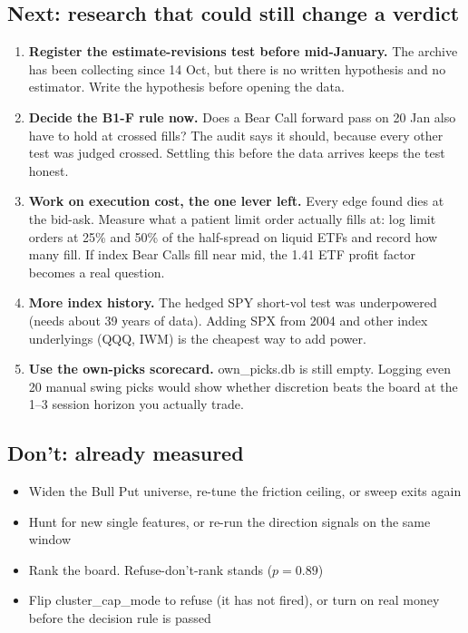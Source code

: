 \documentclass[11pt,a4paper]{article}
\newcommand{\code}[1]{{\ttfamily\small #1}}
\begin{document}
\subsection{Next: research that could still change a verdict}
\begin{enumerate}[resume]
  \item \textbf{Register the estimate-revisions test before mid-January.} The archive has been collecting since 14 Oct,
        but there is no written hypothesis and no estimator. Write the hypothesis before opening the data.
  \item \textbf{Decide the B1-F rule now.} Does a Bear Call forward pass on 20 Jan also have to hold at crossed fills? The audit
        says it should, because every other test was judged crossed. Settling this before the data arrives keeps the test honest.
  \item \textbf{Work on execution cost, the one lever left.} Every edge found dies at the bid-ask. Measure what a patient
        limit order actually fills at: log limit orders at 25\% and 50\% of the half-spread on liquid ETFs and record
        how many fill. If index Bear Calls fill near mid, the 1.41 ETF profit factor becomes a real question.
  \item \textbf{More index history.} The hedged SPY short-vol test was underpowered (needs about 39 years of data). Adding SPX
        from 2004 and other index underlyings (QQQ, IWM) is the cheapest way to add power.
  \item \textbf{Use the own-picks scorecard.} \code{own\_picks.db} is still empty. Logging even 20 manual swing picks would show
        whether discretion beats the board at the 1--3 session horizon you actually trade.
\end{enumerate}

\subsection{Don't: already measured}
\begin{itemize}
  \item Widen the Bull Put universe, re-tune the friction ceiling, or sweep exits again
  \item Hunt for new single features, or re-run the direction signals on the same window
  \item Rank the board. Refuse-don't-rank stands ($p = 0.89$)
  \item Flip \code{cluster\_cap\_mode} to refuse (it has not fired), or turn on real money before the decision rule is passed
\end{itemize}
\end{document}
